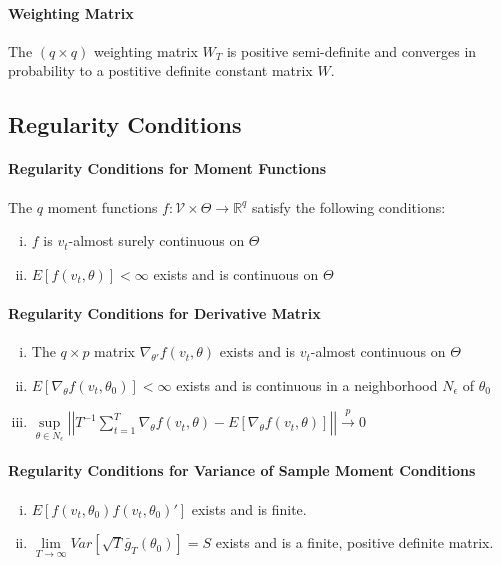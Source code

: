 \paragraph{Weighting Matrix} The $(q\times q)$ weighting matrix $W_T$ is positive semi-definite and converges in probability to a postitive definite constant matrix $W$.

\subsection{Regularity Conditions}


\paragraph{Regularity Conditions for Moment Functions}
The $q$ moment functions $f\colon \mathcal{V}\times \Theta \rightarrow \mathbb{R}^q$ satisfy the following conditions:
	\begin{enumerate}[(i)]
		\item $f$ is $v_t$-almost surely continuous on $\Theta$
		\item $E[f(v_t, \theta)]<\infty$ exists and is continuous on $\Theta$
	\end{enumerate}

\paragraph{Regularity Conditions for Derivative Matrix}
	\begin{enumerate}[(i)]
		\item The $q\times p$ matrix $\nabla_{\theta'} f(v_t, \theta)$ exists and is $v_t$-almost continuous on $\Theta$ 
		\item $E[\nabla_{\theta}f(v_t, \theta_0)]<\infty$ exists and is continuous in a  neighborhood $N_\epsilon$ of $\theta_0$
		\item $\underset{\theta \in N_\epsilon}{\sup}\left| \left| T^{-1} \sum_{t=1}^T \nabla_\theta f(v_t, \theta) - E[\nabla_\theta f(v_t, \theta)]\right|\right| \overset{p}{\rightarrow} 0$
	\end{enumerate}

\paragraph{Regularity Conditions for Variance of Sample Moment Conditions}
\begin{enumerate}[(i)]
	\item $E[f(v_t, \theta_0)f(v_t, \theta_0)']$ exists and is finite.
	\item $\underset{T\rightarrow \infty}{\lim} Var\left[\sqrt{T}\bar{g}_T(\theta_0)\right]=S$ exists and is a finite, positive definite matrix.
\end{enumerate}


